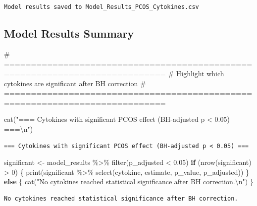 \documentclass[
  letterpaper,
  DIV=11,
  numbers=noendperiod]{scrartcl}
\newenvironment{Shaded}{\begin{snugshade}}{\end{snugshade}}
\newcommand{\CommentTok}[1]{\textcolor[rgb]{0.37,0.37,0.37}{#1}}
\newcommand{\ControlFlowTok}[1]{\textcolor[rgb]{0.00,0.23,0.31}{\textbf{#1}}}
\newcommand{\DecValTok}[1]{\textcolor[rgb]{0.68,0.00,0.00}{#1}}
\newcommand{\FloatTok}[1]{\textcolor[rgb]{0.68,0.00,0.00}{#1}}
\newcommand{\FunctionTok}[1]{\textcolor[rgb]{0.28,0.35,0.67}{#1}}
\newcommand{\NormalTok}[1]{\textcolor[rgb]{0.00,0.23,0.31}{#1}}
\newcommand{\OtherTok}[1]{\textcolor[rgb]{0.00,0.23,0.31}{#1}}
\newcommand{\SpecialCharTok}[1]{\textcolor[rgb]{0.37,0.37,0.37}{#1}}
\newcommand{\StringTok}[1]{\textcolor[rgb]{0.13,0.47,0.30}{#1}}
\begin{document}
\begin{verbatim}
Model results saved to Model_Results_PCOS_Cytokines.csv
\end{verbatim}

\subsection{Model Results Summary}\label{model-results-summary}

\begin{Shaded}
\begin{Highlighting}[]
\CommentTok{\# ============================================================================}
\CommentTok{\# Highlight which cytokines are significant after BH correction}
\CommentTok{\# ============================================================================}

\FunctionTok{cat}\NormalTok{(}\StringTok{"=== Cytokines with significant PCOS effect (BH{-}adjusted p \textless{} 0.05) ===}\SpecialCharTok{\textbackslash{}n}\StringTok{"}\NormalTok{)}
\end{Highlighting}
\end{Shaded}

\begin{verbatim}
=== Cytokines with significant PCOS effect (BH-adjusted p < 0.05) ===
\end{verbatim}

\begin{Shaded}
\begin{Highlighting}[]
\NormalTok{significant }\OtherTok{\textless{}{-}}\NormalTok{ model\_results }\SpecialCharTok{\%\textgreater{}\%} \FunctionTok{filter}\NormalTok{(p\_adjusted }\SpecialCharTok{\textless{}} \FloatTok{0.05}\NormalTok{)}
\ControlFlowTok{if}\NormalTok{ (}\FunctionTok{nrow}\NormalTok{(significant) }\SpecialCharTok{\textgreater{}} \DecValTok{0}\NormalTok{) \{}
  \FunctionTok{print}\NormalTok{(significant }\SpecialCharTok{\%\textgreater{}\%} \FunctionTok{select}\NormalTok{(cytokine, estimate, p\_value, p\_adjusted))}
\NormalTok{\} }\ControlFlowTok{else}\NormalTok{ \{}
  \FunctionTok{cat}\NormalTok{(}\StringTok{"No cytokines reached statistical significance after BH correction.}\SpecialCharTok{\textbackslash{}n}\StringTok{"}\NormalTok{)}
\NormalTok{\}}
\end{Highlighting}
\end{Shaded}

\begin{verbatim}
No cytokines reached statistical significance after BH correction.
\end{verbatim}
\end{document}
